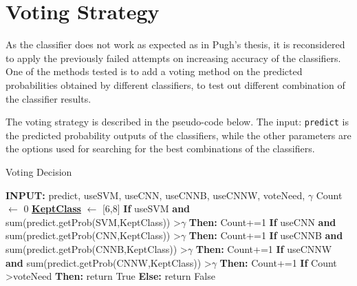 \documentclass[bsc,frontabs,twoside,fullspacing,parskip,deptreport]{infthesis}
\begin{document}



\section{Voting Strategy}
\label{sec:voting}

As the classifier does not work as expected as in Pugh's thesis, it is reconsidered to apply the previously failed attempts on increasing accuracy of the classifiers.
One of the methods tested is to add a voting method on the predicted probabilities obtained by different classifiers, to test out different combination of the classifier results.

The voting strategy is described in the pseudo-code below. 
The input: {\tt predict} is the predicted probability outputs of the classifiers, while the other parameters are the options used for searching for the best combinations of the classifiers. 

\begin{algorithm}
\caption{Voting Decision}
\begin{algorithmic}
\STATE \textbf{INPUT:} predict, useSVM, useCNN, useCNNB, useCNNW, voteNeed, $\gamma$
\STATE Count $\leftarrow$ 0
\STATE \underline{\textbf{KeptClass}} $\leftarrow$ [6,8]
\STATE \textbf{If} useSVM \textbf{and} sum(predict.getProb(SVM,KeptClass)) \textgreater  $\gamma$ \textbf{ Then:} Count+=1
\STATE \textbf{If} useCNN \textbf{and} sum(predict.getProb(CNN,KeptClass)) \textgreater  $\gamma$ \textbf{ Then:} Count+=1
\STATE \textbf{If} useCNNB \textbf{and} sum(predict.getProb(CNNB,KeptClass)) \textgreater  $\gamma$ \textbf{ Then:} Count+=1
\STATE \textbf{If} useCNNW \textbf{and} sum(predict.getProb(CNNW,KeptClass)) \textgreater  $\gamma$ \textbf{ Then:} Count+=1
\STATE \textbf{If} Count \textgreater voteNeed \textbf{ Then:} return True \textbf{ Else:} return False
\end{algorithmic} 
\end{algorithm}
\end{document}
